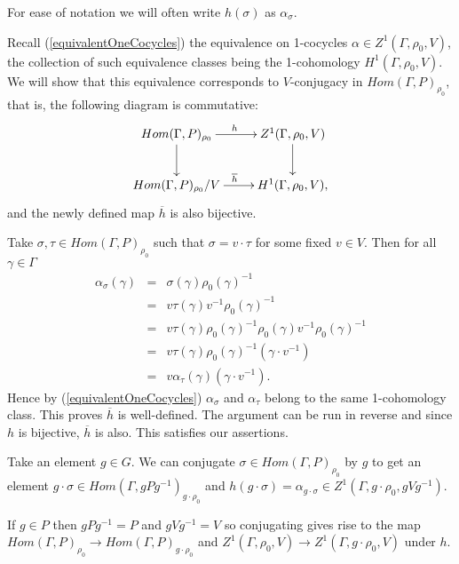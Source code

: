 For ease of notation we will often write $h(\sigma)$ as $\alpha_\sigma$.

Recall (\ref{equivalentOneCocycles}) the equivalence on 1-cocycles $\alpha\in Z^1(\Gamma, \rho_0, V)$, the collection of such equivalence classes being the 1-cohomology $H^1(\Gamma, \rho_0, V)$. We will show that this equivalence corresponds to $V$-conjugacy in $Hom(\Gamma, P)_{\rho_0}$, that is, the following diagram is commutative:
\begin{displaymath}
	\xymatrix{
		Hom(\Gamma, P)_{\rho_0} \ar[r]^h \ar[d] & Z^1(\Gamma, \rho_0, V)\ar[d] \\
		Hom(\Gamma, P)_{\rho_0}/V \ar[r]^{\overline{h}} & H^1(\Gamma, \rho_0, V),
	}
\end{displaymath}
and the newly defined map $\overline{h}$ is also bijective.

Take $\sigma,\tau\in Hom(\Gamma, P)_{\rho_0}$ such that $\sigma = v\cdot\tau$ for some fixed $v\in V$. Then for all $\gamma\in \Gamma$
\begin{eqnarray*}
	\alpha_\sigma(\gamma) &=& \sigma(\gamma)\rho_0(\gamma)^{-1}\\
	&=& v\tau(\gamma)v^{-1}\rho_0(\gamma)^{-1}\\
	&=& v\tau(\gamma)\rho_0(\gamma)^{-1}\rho_0(\gamma)v^{-1}\rho_0(\gamma)^{-1}\\
	&=& v\tau(\gamma)\rho_0(\gamma)^{-1}(\gamma\cdot v^{-1})\\
	&=& v\alpha_\tau(\gamma)(\gamma\cdot v^{-1}).
\end{eqnarray*}
Hence by (\ref{equivalentOneCocycles}) $\alpha_\sigma$ and $\alpha_\tau$ belong to the same 1-cohomology class. This proves $\overline{h}$ is well-defined. The argument can be run in reverse and since $h$ is bijective, $\overline{h}$ is also. This satisfies our assertions.

Take an element $g\in G$. We can conjugate $\sigma\in Hom(\Gamma, P)_{\rho_0}$ by $g$ to get an element $g\cdot\sigma\in Hom(\Gamma, gPg^{-1})_{g\cdot\rho_0}$ and $h(g\cdot\sigma) = \alpha_{g\cdot\sigma}\in Z^1(\Gamma, g\cdot\rho_0, gVg^{-1})$.

If $g\in P$ then $gPg^{-1} = P$ and $gVg^{-1} = V$ so conjugating gives rise to the map $Hom(\Gamma, P)_{\rho_0}\rightarrow Hom(\Gamma, P)_{g\cdot\rho_0}$ and $Z^1(\Gamma, \rho_0, V)\rightarrow Z^1(\Gamma, g\cdot\rho_0, V)$ under $h$.

